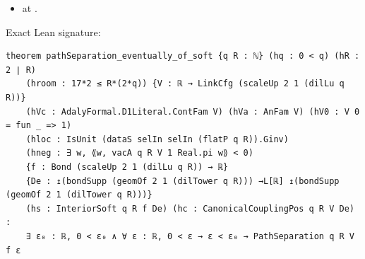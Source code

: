 \begin{theorem}[bp-291]
\begin{itemize}
\item \texttt{} at \texttt{}.
\end{itemize}
\par Exact Lean signature:
\begin{verbatim}
theorem pathSeparation_eventually_of_soft {q R : ℕ} (hq : 0 < q) (hR : 2 ∣ R)
    (hroom : 17*2 ≤ R*(2*q)) {V : ℝ → LinkCfg (scaleUp 2 1 (dilLu q R))}
    (hVc : AdalyFormal.D1Literal.ContFam V) (hVa : AnFam V) (hV0 : V 0 = fun _ => 1)
    (hloc : IsUnit (dataS selIn selIn (flatP q R)).Ginv)
    (hneg : ∃ w, ⟪w, vacA q R V 1 Real.pi w⟫ < 0)
    {f : Bond (scaleUp 2 1 (dilLu q R)) → ℝ}
    {De : ↥(bondSupp (geomOf 2 1 (dilTower q R))) →L[ℝ] ↥(bondSupp (geomOf 2 1 (dilTower q R)))}
    (hs : InteriorSoft q R f De) (hc : CanonicalCouplingPos q R V De) :
    ∃ ε₀ : ℝ, 0 < ε₀ ∧ ∀ ε : ℝ, 0 < ε → ε < ε₀ → PathSeparation q R V f ε
\end{verbatim}
\end{theorem}

